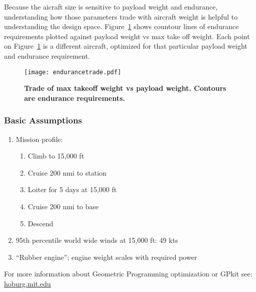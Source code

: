 \documentclass[10pt, a4paper]{article}
\begin{document}
Because the aicraft size is sensitive to payload weight and endurance, understanding how those parameters trade with aircraft weight is helpful to understanding the design space.  
Figure~\ref{f:endurancetrade} shows countour lines of endurance requirements plotted against payload weight vs max take off weight.  
Each point on Figure~\ref{f:endurancetrade} is a different aircraft, optimized for that particular payload weight and endurance requirement. 

\begin{figure}[H]
    \begin{center}
        \texttt{[image: endurancetrade.pdf]}
        \caption{\textbf{Trade of max takeoff weight vs payload weight.  Contours are endurance requirements.}}
        \label{f:endurancetrade}
    \end{center}
\end{figure}

\subsubsection*{Basic Assumptions}

\begin{enumerate}

    \item Mission profile:
        \begin{enumerate}
            \item Climb to 15,000 ft
            \item Cruise 200 nmi to station
            \item Loiter for 5 days at 15,000 ft
            \item Cruise 200 nmi to base
            \item Descend 
            \end{enumerate}
    \item 95th percentile world wide winds at 15,000 ft: 49 kts
    \item ``Rubber engine''; engine weight scales with required power

\end{enumerate}

For more information about Geometric Programming optimization or GPkit see: \url{hoburg.mit.edu}
\end{document}
